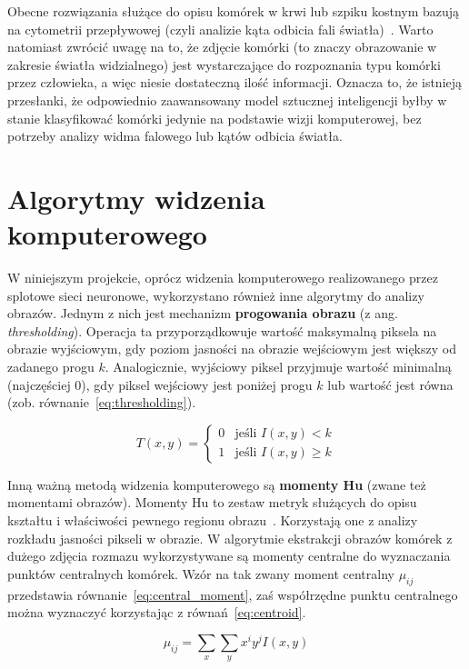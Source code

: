 Obecne rozwiązania służące do opisu komórek w krwi lub szpiku kostnym bazują na cytometrii przepływowej (czyli analizie kąta odbicia fali światła)~\cite{cytometry}.
Warto natomiast zwrócić uwagę na to, że zdjęcie komórki (to znaczy obrazowanie w zakresie światła widzialnego) jest wystarczające do rozpoznania typu komórki przez człowieka, a więc niesie dostateczną ilość informacji.
Oznacza to, że istnieją przesłanki, że odpowiednio zaawansowany model sztucznej inteligencji byłby w stanie klasyfikować komórki jedynie na podstawie wizji komputerowej, bez potrzeby analizy widma falowego lub kątów odbicia światła.


\section{Algorytmy widzenia komputerowego}

W niniejszym projekcie, oprócz widzenia komputerowego realizowanego przez splotowe sieci neuronowe, wykorzystano również inne algorytmy do analizy obrazów.
Jednym z nich jest mechanizm \textbf{progowania obrazu} (z ang. \textit{thresholding}).
Operacja ta przyporządkowuje wartość maksymalną piksela na obrazie wyjściowym, gdy poziom jasności na obrazie wejściowym jest większy od zadanego progu $k$.
Analogicznie, wyjściowy piksel przyjmuje wartość minimalną (najczęściej $0$), gdy piksel wejściowy jest poniżej progu $k$ lub wartość jest równa (zob.
równanie~\ref{eq:thresholding}).

\begin{equation}
    T(x, y) =
    \begin{cases}
        0 & \text{jeśli } I(x, y) < k \\
        1 & \text{jeśli } I(x, y) \geq k
    \end{cases}\label{eq:thresholding}
\end{equation}

Inną ważną metodą widzenia komputerowego są \textbf{momenty Hu} (zwane też momentami obrazów).
Momenty Hu to zestaw metryk służących do opisu kształtu i właściwości pewnego regionu obrazu~\cite{vision}.
Korzystają one z analizy rozkładu jasności pikseli w obrazie.
W algorytmie ekstrakcji obrazów komórek z dużego zdjęcia rozmazu wykorzystywane są momenty centralne do wyznaczania punktów centralnych komórek.
Wzór na tak zwany moment centralny $\mu_{ij}$ przedstawia równanie~\ref{eq:central_moment}, zaś współrzędne punktu centralnego można wyznaczyć korzystając z równań~\ref{eq:centroid}.

\begin{equation}
    \mu_{ij} = \sum_x \sum_y x^i y^j I(x, y)\label{eq:central_moment}
\end{equation}

